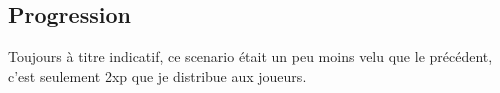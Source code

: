 \subsection{Progression}
Toujours à titre indicatif, ce scenario était un peu moins velu que le précédent, c’est seulement 2xp que je distribue aux joueurs.




